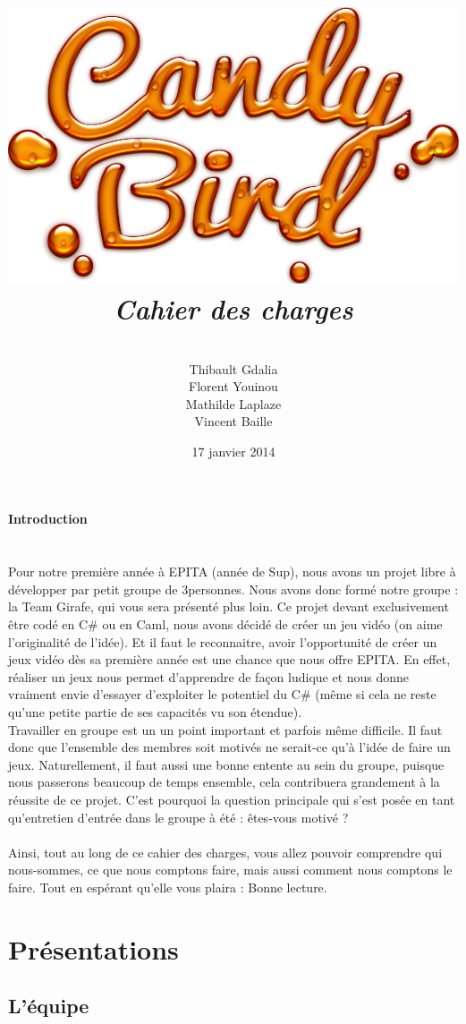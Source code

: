 \documentclass [11pt]{report}
\title{
	\includegraphics[scale=0.43]{images/Logojeu.png}
	 \\\vspace{20mm}
	\textbf{\Huge \itshape Cahier des charges }
	}
\author{ \\\vspace{2mm}
	Thibault Gdalia\\\vspace{2mm}
	Florent Youinou\\\vspace{2mm}
	Mathilde Laplaze\\\vspace{2mm}
	Vincent Baille \\\vspace{30mm}
	}
\date{17 janvier 2014}
\begin{document}
\renewcommand{\baselinestretch}{0.001}
\maketitle
\tableofcontents

\newpage


\textbf{{\Huge Introduction}}\\
\\
\\
		\indent Pour notre première année à EPITA (année de Sup), nous avons un projet libre à développer par petit groupe de 3personnes. Nous avons donc formé notre groupe : la Team Girafe, qui vous sera présenté plus loin. Ce projet devant exclusivement être codé en C\# ou en Caml, nous avons décidé de créer un jeu vidéo (on 		aime l'originalité de l'idée). Et il faut le reconnaitre, avoir l'opportunité de créer un jeux vidéo dès sa première année est une chance que nous offre EPITA. En effet, réaliser un jeux nous permet d'apprendre de façon ludique et nous donne vraiment envie d'essayer d'exploiter le potentiel du C\# (même si cela ne reste qu'une petite partie 		de ses capacités vu son étendue).\\

		\indent Travailler en groupe est un un point important et parfois même difficile. Il faut donc que l'ensemble des membres soit motivés ne serait-ce qu'à l'idée de faire un jeux. Naturellement, il faut aussi une bonne entente au sein du groupe, puisque nous passerons beaucoup de temps ensemble, cela contribuera grandement à la 			réussite de ce projet. C'est pourquoi la question principale qui s'est posée en tant qu'entretien d'entrée dans le groupe à été : êtes-vous motivé ?\\\\
		\indent Ainsi, tout au long de ce cahier des charges, vous allez pouvoir comprendre qui nous-sommes, ce que nous comptons faire, mais aussi comment nous comptons le faire. Tout en espérant qu'elle vous plaira : Bonne lecture.
		
\chapter {Pr\'esentations}

	\section{ L'\'equipe }
\end{document}

